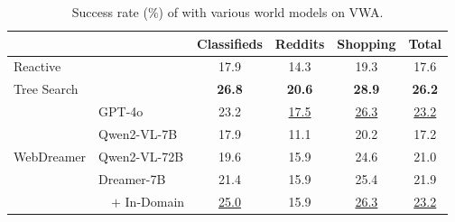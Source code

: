\begin{table}[htb]
\centering
\small
\begin{tabular}{clcccc}
\toprule
\multicolumn{1}{l}{}        &                & Classifieds   & Reddits       & Shopping    & Total      \\ \midrule
\multicolumn{2}{l}{Reactive}                 & 17.9          & 14.3          & 19.3        & 17.6  \\
\multicolumn{2}{l}{Tree Search~\citep{koh2024visualwebarena}}              & \textbf{26.8} & \textbf{20.6} & \textbf{28.9} & \textbf{26.2} \\ \midrule
\multirow{5}{*}{WebDreamer} & GPT-4o         & 23.2          & \underline{17.5}    & \underline{26.3}  & \underline{23.2}       \\
                            & Qwen2-VL-7B       & 17.9          & 11.1          & 20.2   & 17.2       \\
                            & Qwen2-VL-72B      & 19.6          & 15.9          & 24.6   & 21.0       \\
                            & Dreamer-7B & 21.4          & 15.9          & 25.4   & 21.9         \\
                            & ~~$+$ In-Domain   & \underline{25.0}    & 15.9          & \underline{26.3}  & \underline{23.2} 
                            \\ \bottomrule
\end{tabular}
\caption{Success rate (\%) of \OurMethod with various world models on VWA.}
\label{tab:in-domain}

\end{table}